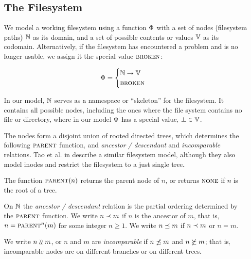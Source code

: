 
\subsection{The Filesystem}

We model a working filesystem
using a function $\Phi$ with a set of nodes (filesystem paths) $\mathbb{N}$ as its domain,
and a set of possible contents or values $\mathbb{V}$ as its codomain.
Alternatively, if the filesystem has encountered a problem and is no longer usable, 
we assign it the special value $\text{\normalfont\scshape{broken}}$:
\begin{mydef}[Filesystem]
\begin{gather*}
\Phi =
\begin{cases}
\mathbb{N} \rightarrow \mathbb{V} \\
\text{\normalfont\scshape{broken}}
\end{cases}
\end{gather*}
\end{mydef}
In our model, $\mathbb{N}$ 
serves as a namespace or ``skeleton'' for the filesystem.
It contains all possible nodes, including the ones 
where the file system contains no file or directory,
where in our model $\Phi$ has a special value, $\bot\in\mathbb{V}$.

The nodes form a disjoint union of rooted directed trees,
which determines the following $\parent$ function,
and \emph{ancestor / descendant} and \emph{incomparable} relations.
Tao et al. in \cite{TSR} describe a similar filesystem model, although
they also model inodes and restrict the filesystem to a just single tree.
\begin{mydef}[$\parent$]
The function $\text{\normalfont\scshape{parent}}(n)$ returns the parent node of $n$, or
returns $\text{\normalfont\scshape{none}}$ if $n$ is the root of a tree.
\end{mydef}

\begin{mydef}[$n\descendant m$]
On $\mathbb{N}$ the \emph{ancestor / descendant} relation is the
partial ordering determined by the $\parent$ function.
We write $n\descendant m$ if $n$ is the ancestor of $m$,
that is, $n=\text{\normalfont\scshape{parent}}^n(m)$ for some integer $n\ge 1$.
We write $n\preceq m$ if $n\descendant m$ or $n=m$.
\end{mydef}

\begin{mydef}[$n\unrel m$]
We write $n\unrel m$, or $n$ and $m$ are \emph{incomparable}
if $n\not\preceq m$ and $n\not\succeq m$;
that is, incomparable nodes are on different branches or on different trees.
\end{mydef}

